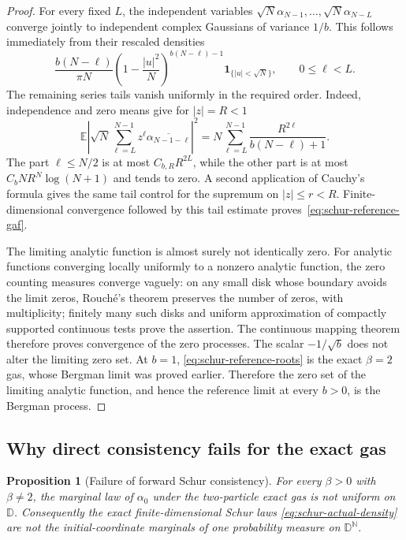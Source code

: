 \documentclass[11pt,a4paper]{article}
\numberwithin{equation}{section}
\newtheorem{proposition}[theorem]{Proposition}
\theoremstyle{definition}
\theoremstyle{remark}
\begin{document}
\begin{proof}
For every fixed $L$, the independent variables
$\sqrt N\alpha_{N-1},\ldots,\sqrt N\alpha_{N-L}$ converge jointly to
independent complex Gaussians of variance $1/b$. This follows
immediately from their rescaled densities
\[
 \frac{b(N-\ell)}{\pi N}
 \left(1-\frac{|u|^2}{N}\right)^{b(N-\ell)-1}
 \mathbf1_{\{|u|<\sqrt N\}},\qquad 0\le\ell<L.
\]
The remaining series tails vanish uniformly in the required order.
Indeed, independence and zero means give for $|z|=R<1$
\[
 \mathbb E\left|\sqrt N\sum_{\ell=L}^{N-1}
           z^\ell\overline{\alpha_{N-1-\ell}}\right|^2
 =N\sum_{\ell=L}^{N-1}
       \frac{R^{2\ell}}{b(N-\ell)+1}.
\]
The part $\ell\le N/2$ is at most $C_{b,R}R^{2L}$, while the other
part is at most $C_bN R^N\log(N+1)$ and tends to zero. A second
application of Cauchy's formula gives the same tail control for the
supremum on $|z|\le r<R$. Finite-dimensional convergence followed by
this tail estimate proves~\eqref{eq:schur-reference-gaf}.

The limiting analytic function is almost surely not identically zero.
For analytic functions converging locally uniformly to a nonzero
analytic function, the zero counting measures converge vaguely: on
any small disk whose boundary avoids the limit zeros, Rouch\'e's
theorem preserves the number of zeros, with multiplicity; finitely
many such disks and uniform approximation of compactly supported
continuous tests prove the assertion. The continuous mapping theorem
therefore proves convergence of the zero processes. The scalar
$-1/\sqrt b$ does not alter the limiting zero set. At $b=1$,
\eqref{eq:schur-reference-roots} is the exact $\beta=2$ gas, whose
Bergman limit was proved earlier. Therefore the zero set of the
limiting analytic function, and hence the reference limit at every
$b>0$, is the Bergman process.
\end{proof}

\subsection{Why direct consistency fails for the exact gas}

\begin{proposition}[Failure of forward Schur consistency]
\label{prop:schur-nonprojectivity}
For every $\beta>0$ with $\beta\ne2$, the marginal law of $\alpha_0$
under the two-particle exact gas is not uniform on $\mathbb D$.
Consequently the exact finite-dimensional Schur laws
\eqref{eq:schur-actual-density} are not the initial-coordinate
marginals of one probability measure on $\mathbb D^{\mathbb N}$.
\end{proposition}
\end{document}
